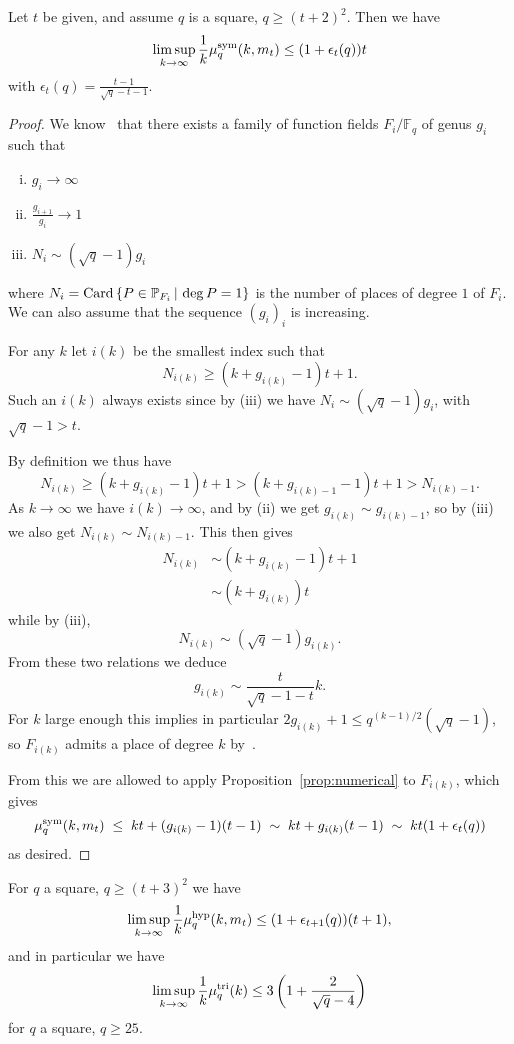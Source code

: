 \documentclass[11pt]{article}
\begin{document}
\begin{prop}
\label{prop:asymptsquare}
Let $t$ be given, and assume $q$ is a square, $q\geq(t+2)^2$.
Then we have
\[
\limsup_{k\to\infty}\frac{1}{k}\mu^{\textrm{sym}}_q(k,m_t)\leq(1+\epsilon_t(q))t
\]
with $\epsilon_t(q)=\frac{t-1}{\sqrt{q}-t-1}$.
\end{prop}
\begin{proof}
We know~\cite{STV92} that there exists a family of function fields
$F_i/\mathbb{F}_q$ of genus $g_i$ such that
\begin{enumerate}[(i)]
  \item $g_i\to\infty$
  \item $\frac{g_{i+1}}{g_i}\to1$
  \item $N_i\sim (\sqrt q - 1)g_i$
\end{enumerate}
where $N_i = \operatorname{Card}\left\{ P\in\mathbb{P}_{F_i}\,|\,\deg P = 1 \right\}$
is the number of places of degree $1$ of $F_i$. We can also assume that the sequence
$(g_i)_i$ is increasing. 

For any $k$ let $i(k)$ be the smallest index such that
\[ N_{i(k)} \geq (k + g_{i(k)}-1)t +1. \]
Such an $i(k)$ always exists since by (iii) we have $N_i\sim (\sqrt q - 1)g_i$,
with $\sqrt q - 1>t$.

By definition we thus have
\[ N_{i(k)} \geq (k + g_{i(k)}-1)t +1 > (k + g_{i(k)-1}-1)t +1 > N_{i(k)-1}. \]
As $k\to\infty$ we have $i(k)\to\infty$, and by (ii) we get $g_{i(k)}\sim g_{i(k)-1}$,
so by (iii) we also get $N_{i(k)}\sim N_{i(k)-1}$. This then gives
\[ \begin{split} N_{i(k)} &\sim (k + g_{i(k)}-1)t +1\\ &\sim (k + g_{i(k)})t \end{split} \]
while by (iii),
\[ N_{i(k)} \sim (\sqrt q - 1)g_{i(k)}. \]
From these two relations we deduce
\[ g_{i(k)} \sim \frac{t}{\sqrt{q}-1-t}k. \]
For $k$ large enough this implies in particular $2g_{i(k)} +1 \leq q^{(k-1)/2}(\sqrt q-1)$,
so $F_{i(k)}$ admits a place of degree $k$ by~\cite[Corollary 5.2.10.]{Stichtenoth09}.

From this we are allowed to apply Proposition~\ref{prop:numerical} to $F_{i(k)}$, which gives
\[ \mu^{\textrm{sym}}_q(k,m_t)\;\leq\; kt+(g_{i(k)}-1)(t-1)\;\sim\; kt+g_{i(k)}(t-1)\;\sim\; kt(1+\epsilon_t(q)) \]
as desired.
\end{proof}

\begin{cor}
\label{cor:asymptsquare}
For $q$ a square, $q\geq(t+3)^2$ we have
\[
\limsup_{k\to\infty}\frac{1}{k}\mu^{\textrm{hyp}}_q(k,m_t)\leq(1+\epsilon_{t+1}(q))(t+1),
\]
and in particular we have
\[ \limsup_{k\to\infty}\frac{1}{k}\mu^{\textrm{tri}}_q(k)\leq 3\left(1+\frac{2}{\sqrt{q}-4}\right) \]
for $q$ a square, $q\geq 25$.
\end{cor}
\end{document}
